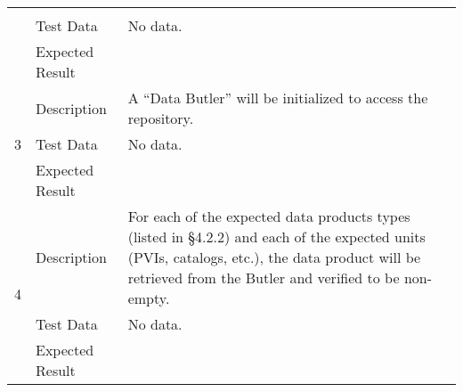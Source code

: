 \begin{longtable}[]{p{1.3cm}p{2cm}p{13cm}}
\begin{minipage}[t]{13cm}
{            \vspace{\dp0}
            } \end{minipage} \\ \cline{2-3}
            & Test Data &
            \begin{minipage}[t]{13cm}{\footnotesize
                No data.
                \vspace{\dp0}
            } \end{minipage} \\ \cline{2-3}
            & Expected Result &
        \\ \midrule

            \multirow{3}{*}{ 3 } & Description &
            \begin{minipage}[t]{13cm}{\footnotesize
            A ``Data Butler'' will be initialized to access the repository.

            \vspace{\dp0}
            } \end{minipage} \\ \cline{2-3}
            & Test Data &
            \begin{minipage}[t]{13cm}{\footnotesize
                No data.
                \vspace{\dp0}
            } \end{minipage} \\ \cline{2-3}
            & Expected Result &
        \\ \midrule

            \multirow{3}{*}{ 4 } & Description &
            \begin{minipage}[t]{13cm}{\footnotesize
            For each of the expected data products types (listed in §4.2.2) and each
of the expected units (PVIs, catalogs, etc.), the data product will be
retrieved from the Butler and verified to be non-empty.

            \vspace{\dp0}
            } \end{minipage} \\ \cline{2-3}
            & Test Data &
            \begin{minipage}[t]{13cm}{\footnotesize
                No data.
                \vspace{\dp0}
            } \end{minipage} \\ \cline{2-3}
            & Expected Result &
        \\ \midrule


\end{longtable}
